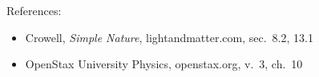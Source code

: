 References:
\begin{itemize}
\item Crowell, \emph{Simple Nature}, lightandmatter.com, sec.~8.2, 13.1
\item OpenStax University Physics, openstax.org, v.~3, ch.~10
\end{itemize}

